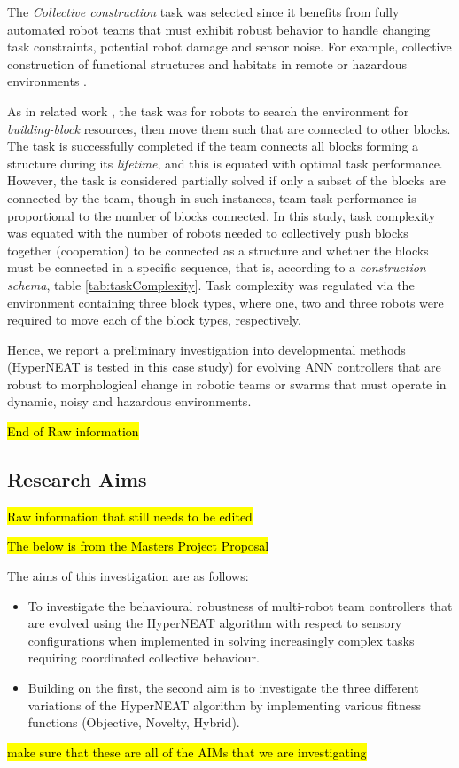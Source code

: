 \documentclass[conference]{IEEEtran}
\begin{document}
The \textit{Collective construction} task \cite{WerfelPetersenNagpal2014} was selected since it benefits
from fully automated robot teams that must exhibit robust behavior to handle changing task constraints,
potential robot damage and sensor noise.
For example, collective construction of functional structures and habitats in remote or hazardous
environments \cite{WerfelNagpal2008}.

As in related work \cite{WerfelPetersenNagpal2014}, the task was for robots to search the environment
for \textit{building-block} resources, then move them such that are connected to other blocks.
The task is successfully completed if the team connects all blocks forming a structure during its \textit{lifetime}, and this is equated
with optimal task performance.
However, the task is considered partially solved if only a subset of the blocks are connected by the team,
though in such instances, team task performance is proportional to the number of blocks connected.
In this study, task complexity was equated with the number of robots needed
to collectively push blocks together (cooperation) to be connected as a structure and whether the blocks
must be connected in a specific sequence, that is, according to a \textit{construction schema},
table \ref{tab:taskComplexity}.
Task complexity was regulated via the environment containing three block types, where one, two and three robots were required to move each of the block types, respectively.

Hence, we report a preliminary investigation into developmental methods (HyperNEAT is tested in this case
study) for evolving ANN controllers that are robust to morphological change in robotic teams or swarms that
must operate in dynamic, noisy and hazardous environments.

\hl{End of Raw information}

\subsection{Research Aims}

\hl{Raw information that still needs to be edited}

\hl{The below is from the Masters Project Proposal}

The aims of this investigation are as follows:
\begin{itemize}
	\item To investigate the behavioural robustness of multi-robot team controllers that are evolved using the HyperNEAT algorithm with respect to sensory configurations when implemented in solving increasingly complex tasks requiring coordinated collective behaviour.
	\item Building on the first, the second aim is to investigate the three different variations of the HyperNEAT algorithm by implementing various fitness functions (Objective, Novelty, Hybrid).
\end{itemize}
\hl{make sure that these are all of the AIMs that we are investigating}
\end{document}
